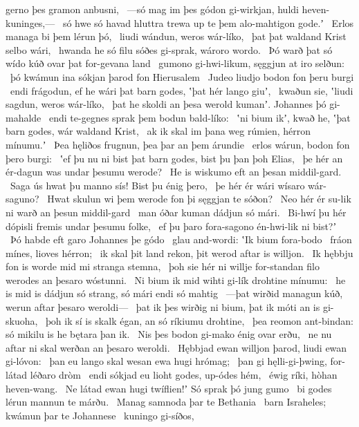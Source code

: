 gerno þes gramon anbusni, \hld\ —só mag im þes gódon gi-wirkjan,
huldi heven-kuninges,— \hld\ só hwe só havad hluttra trewa
up te þem alo-mahtigon gode.ʼ \hld\ Erlos managa
bi þem lérun þó, \hld\ liudi wándun,
weros wár-líko, \hld\ þat þat waldand Krist
selbo wári, \hld\ hwanda he só filu sóðes gi-sprak,
wároro wordo. \hld\ Þó warð þat só wído kúð
ovar þat for-gevana land \hld\ gumono gi-hwi-likum,
sęggjun at iro selðun: \hld\ þó kwámun ina sókjan þarod
fon Hierusalem \hld\ Judeo liudjo
bodon fon þeru burgi \hld\ endi frágodun, ef he wári þat barn godes,
ʽþat hér lango giuʼ, \hld\ kwaðun sie, ʽliudi sagdun,
weros wár-líko, \hld\ þat he skoldi an þesa werold kumanʼ.
Johannes þó gi-mahalde \hld\ endi te-gegnes sprak
þem bodun bald-líko: \hld\ ʽni bium ikʼ, kwað he, ʽþat barn godes,
wár waldand Krist, \hld\ ak ik skal im þana weg rúmien,
hérron mínumu.ʼ \hld\ Þea hęliðos frugnun,
þea þar an þem árundie \hld\ erlos wárun,
bodon fon þero burgi: \hld\ ʽef þu nu ni bist þat barn godes,
bist þu þan þoh Elias, \hld\ þe hér an ér-dagun
was undar þesumu werode? \hld\ He is wiskumo
eft an þesan middil-gard. \hld\ Saga ús hwat þu manno sís!
Bist þu énig þero, \hld\ þe hér ér wári
wísaro wár-saguno? \hld\ Hwat skulun wi þem werode fon þi
sęggjan te sóðon? \hld\ Neo hér ér su-lik ni warð
an þesun middil-gard \hld\ man óðar kuman
dádjun só mári. \hld\ Bi-hwí þu hér dópisli
fremis undar þesumu folke, \hld\ ef þu þaro fora-sagono
én-hwi-lik ni bist?ʼ \hld\ Þó habde eft garo
Johannes þe gódo \hld\ glau and-wordi:
ʽIk bium fora-bodo \hld\ fráon mínes,
lioves hérron; \hld\ ik skal þit land rekon,
þit werod aftar is willjon. \hld\ Ik hębbju fon is worde mid mi
stranga stemna, \hld\ þoh sie hér ni willje for-standan filo
werodes an þesaro wóstunni. \hld\ Ni bium ik mid wihti gi-lík
drohtine mínumu: \hld\ he is mid is dádjun só strang,
só mári endi só mahtig \hld\ —þat wirðid managun kúð,
werun aftar þesaro weroldi— \hld\ þat ik þes wirðig ni bium,
þat ik móti an is gi-skuoha, \hld\ þoh ik sí is skalk égan,
an só ríkiumu drohtine, \hld\ þea reomon ant-bindan:
só mikilu is he bętara þan ik. \hld\ Nis þes bodon gi-mako
énig ovar erðu, \hld\ ne nu aftar ni skal
werðan an þesaro weroldi. \hld\ Hębbjad ewan willjon þarod,
liudi ewan gi-lóvon: \hld\ þan eu lango skal
wesan ewa hugi hrómag; \hld\ þan gi hęlli-gi-þwing,
for-látad léðaro dròm \hld\ endi sókjad eu lioht godes,
up-ódes hém, \hld\ éwig ríki,
hòhan heven-wang. \hld\ Ne látad ewan hugi twíflien!ʼ
Só sprak þó jung gumo \hld\ bi godes lérun
mannun te márðu. \hld\ Manag samnoda
þar te Bethania \hld\ barn Israheles;
kwámun þar te Johannese \hld\ kuningo gi-síðos,
